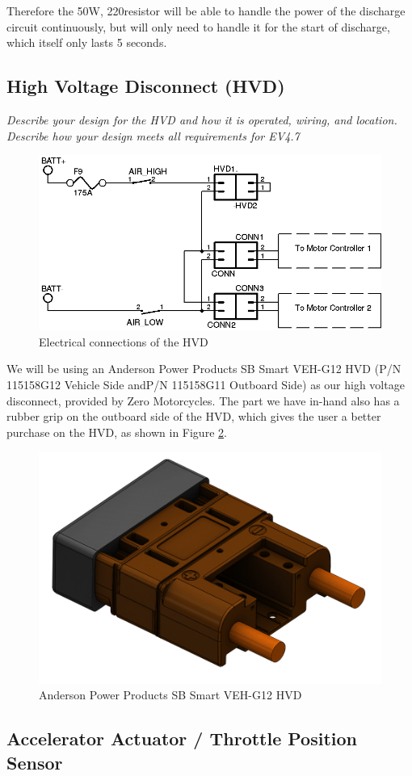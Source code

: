 \documentclass{article}
\begin{document}
    Therefore the 50W, 220\ohm  resistor will be able to handle the power of the discharge circuit continuously, but will only need to handle it for the start of discharge, which itself only lasts 5 seconds.

    \subsection{High Voltage Disconnect (HVD)}

    \textit{Describe your design for the HVD and how it is operated, wiring, and location. Describe how your design meets all requirements for EV4.7}

    \begin{figure}[H]
        \centering
        \includegraphics[width = 0.5 \textwidth]{HVD}
        \caption{Electrical connections of the HVD}
        \label{hvdschem}
    \end{figure}

    We will be using an Anderson Power Products SB Smart VEH-G12 HVD (P/N 115158G12 Vehicle Side andP/N 115158G11 Outboard Side) as our high voltage disconnect, provided by Zero Motorcycles.  The part we have in-hand also has a rubber grip on the outboard side of the HVD, which gives the user a better purchase on the HVD, as shown in Figure \ref{hvdpic}.

    \begin{figure}[H]
        \centering
        \includegraphics[width = 0.4 \textwidth]{anderson_hvd_interlock}
        \caption{Anderson Power Products SB Smart VEH-G12 HVD}
        \label{hvdpic}
    \end{figure}

    \subsection{Accelerator Actuator / Throttle Position Sensor}
\end{document}
